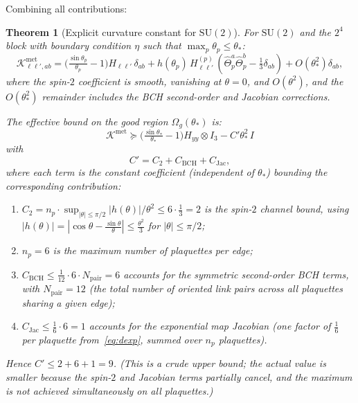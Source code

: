 \documentclass[11pt,a4paper]{article}
\theoremstyle{plain}
\newtheorem{theorem}{Theorem}[section]
\theoremstyle{definition}
\theoremstyle{remark}
\newcommand{\SU}{\mathrm{SU}}
\newcommand{\cK}{\mathcal{K}}
\begin{document}
Combining all contributions:

\begin{theorem}[Explicit curvature constant for $\SU(2)$]\label{thm:C-prime-su2}
For $\SU(2)$ and the $2^4$ block with boundary condition $\eta$
such that $\max_p\theta_p \leq \theta_*$:
\begin{equation}
\cK^{\mathrm{met}}_{\ell\ell',ab}
= \bigl(\tfrac{\sin\theta_p}{\theta_p} - 1\bigr)
  H_{\ell\ell'}\,\delta_{ab}
+ h(\theta_p)\,H^{(p)}_{\ell\ell'}\,
  (\hat\Theta_p^a\hat\Theta_p^b - \tfrac{1}{3}\delta_{ab})
+ O(\theta_*^2)\delta_{ab},
\end{equation}
where the spin-$2$ coefficient is smooth, vanishing at
$\theta = 0$, and $O(\theta^2)$, and the $O(\theta_*^2)$
remainder includes the BCH second-order and Jacobian corrections.

The effective bound on the good region $\Omega_g(\theta_*)$ is:
\begin{equation}
\cK^{\mathrm{met}} \succeq
\bigl(\tfrac{\sin\theta_*}{\theta_*} - 1\bigr)H_{yy}\otimes I_3
- C'\theta_*^2\,I
\end{equation}
with
\begin{equation}\label{eq:C-prime-explicit}
C' = C_2 + C_{\mathrm{BCH}} + C_{\mathrm{Jac}},
\end{equation}
where each term is the constant coefficient (independent of
$\theta_*$) bounding the corresponding contribution:
\begin{enumerate}[label=(\roman*)]
\item $C_2 = n_p \cdot \sup_{|\theta|\leq\pi/2}
  |h(\theta)|/\theta^2 \leq 6 \cdot \frac{1}{3} = 2$
  is the spin-$2$ channel bound, using
  $|h(\theta)| = |\cos\theta - \frac{\sin\theta}{\theta}|
  \leq \frac{\theta^2}{3}$ for $|\theta| \leq \pi/2$;
\item $n_p = 6$ is the maximum number of plaquettes per edge;
\item $C_{\mathrm{BCH}} \leq \frac{1}{12}\cdot 6 \cdot N_{\mathrm{pair}}
  = 6$ accounts for the symmetric second-order BCH terms, with
  $N_{\mathrm{pair}} = 12$ (the total number of oriented link
  pairs across all plaquettes sharing a given edge);
\item $C_{\mathrm{Jac}} \leq \frac{1}{6}\cdot 6 = 1$ accounts for
  the exponential map Jacobian (one factor of $\frac{1}{6}$ per
  plaquette from~\eqref{eq:dexp}, summed over $n_p$ plaquettes).
\end{enumerate}

Hence $C' \leq 2 + 6 + 1 = 9$. (This is a crude upper bound;
the actual value is smaller because the spin-$2$ and Jacobian
terms partially cancel, and the maximum is not achieved
simultaneously on all plaquettes.)
\end{theorem}
\end{document}
